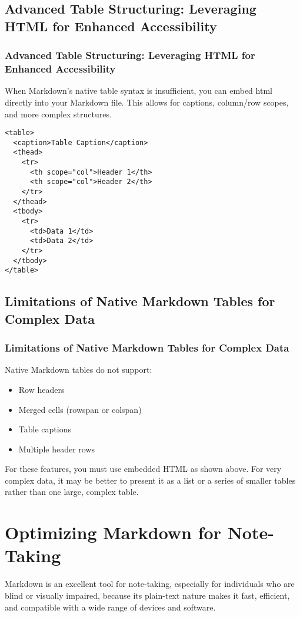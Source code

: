 \subsection{Advanced Table Structuring: Leveraging HTML for Enhanced Accessibility}
\label{subsec:markdown-html-tables}
\subsubsection{Advanced Table Structuring: Leveraging HTML for Enhanced Accessibility}
\label{ssubsec:markdown-html-tables-details}
When Markdown's native table syntax is insufficient, you can embed \gls{html} directly into your Markdown file. This allows for captions, column/row scopes, and more complex structures.
\begin{verbatim}
<table>
  <caption>Table Caption</caption>
  <thead>
    <tr>
      <th scope="col">Header 1</th>
      <th scope="col">Header 2</th>
    </tr>
  </thead>
  <tbody>
    <tr>
      <td>Data 1</td>
      <td>Data 2</td>
    </tr>
  </tbody>
</table>
\end{verbatim}

\subsection{Limitations of Native Markdown Tables for Complex Data}
\label{subsec:markdown-table-limitations}
\subsubsection{Limitations of Native Markdown Tables for Complex Data}
\label{ssubsec:markdown-table-limitations-details}
Native Markdown tables do not support:
\begin{itemize}
	\item Row headers
	\item Merged cells (rowspan or colspan)
	\item Table captions
	\item Multiple header rows
\end{itemize}
For these features, you must use embedded HTML as shown above. For very complex data, it may be better to present it as a list or a series of smaller tables rather than one large, complex table.

\section{Optimizing Markdown for Note-Taking}
\label{sec:markdown-for-notetaking}
Markdown is an excellent tool for note-taking, especially for individuals who are blind or visually impaired, because its plain-text nature makes it fast, efficient, and compatible with a wide range of devices and software.

